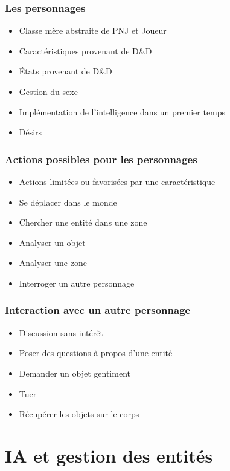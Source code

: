 \documentclass{beamer}
\begin{document}
\begin{frame}
      \frametitle{Les personnages}
    \begin{itemize}
        \item Classe mère abstraite de PNJ et Joueur
        \item Caractéristiques provenant de D\&D
        \item États provenant de D\&D
        \item Gestion du sexe
        \item Implémentation de l'intelligence dans un premier temps
        \item Désirs
    \end{itemize} 
\end{frame}

\begin{frame}
      \frametitle{Actions possibles pour les personnages}
    \begin{itemize}
        \item Actions limitées ou favorisées par une caractéristique
        \item Se déplacer dans le monde
        \item Chercher une entité dans une zone
        \item Analyser un objet
        \item Analyser une zone
        \item Interroger un autre personnage
    \end{itemize} 
\end{frame}

\begin{frame}
    \frametitle{Interaction avec un autre personnage}
      \begin{itemize}
          \item Discussion sans intérêt
          \item Poser des questions à propos d'une entité
          \item Demander un objet gentiment
          \item Tuer
          \item Récupérer les objets sur le corps
      \end{itemize} 
\end{frame}

\author{GUINGOIN Sylvain}
\section{IA et gestion des entités}
\end{document}
